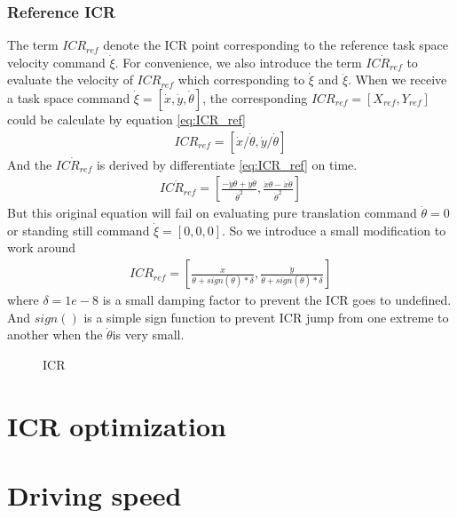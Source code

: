 \subsubsection{Reference ICR}
The term $ICR_{ref}$ denote the ICR point corresponding to the reference task space velocity command $\dot{\xi}$. For convenience, we also introduce the term $\dot{ICR_{ref}}$ to evaluate the velocity of $ICR_{ref}$ which corresponding to $\dot{\xi}$ and $\ddot{\xi}$.
When we receive a task space command $\dot{\xi}=[\dot{x},\dot{y},\dot{\theta}]$, the corresponding $ICR_{ref}=[X_{ref},Y_{ref}]$ could be calculate by equation \cref{eq:ICR_ref}
\begin{equation}\label{eq:ICR_ref}
    \begin{split}
        ICR_{ref}=[\dot{x}/\dot{\theta},\dot{y}/\dot{\theta}]
    \end{split}
\end{equation}
And the $\dot{ICR_{ref}}$ is derived by differentiate \cref{eq:ICR_ref} on time.
\begin{equation}\label{eq:ICRdot_ref}
    \begin{split}
        \dot{ICR_{ref}}=[\frac{-\ddot{y}\dot{\theta}+\dot{y}\ddot{\theta}}{\dot{\theta}^2},\frac{\ddot{x}\dot{\theta}-\dot{x}\ddot{\theta}}{\dot{\theta}^2}]
    \end{split}
\end{equation}
But this original equation will fail on evaluating pure translation command $\dot{\theta}=0$ or standing still command $\dot{\xi}=[0, 0, 0]$. So we introduce a small modification to work around
\begin{equation}\label{eq:ICR_refModified}
    \begin{split}
         ICR_{ref}=[\frac{\dot{x}}{\dot{\theta}+sign(\dot{\theta})*\delta} ,\frac{\dot{y}}{\dot{\theta}+sign(\dot{\theta})*\delta}]
    \end{split}
\end{equation}
where $\delta=1e-8$ is a small damping factor to prevent the ICR goes to undefined. And $sign()$ is a simple sign function to prevent ICR jump from one extreme to another when the $\dot{\theta}$is very small.

\begin{figure}[t]
	\begin{center}
	\resizebox{10cm}{!}
    {
		}
	\end{center}
	\caption{ICR}
\end{figure}

\section{ICR optimization}


\section{Driving speed}

